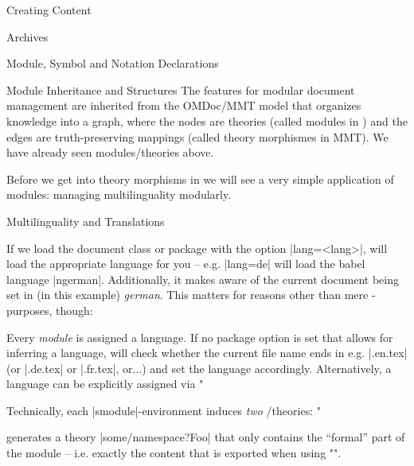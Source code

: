 \begin{sfragment}{Creating \sTeX Content}
  \begin{sfragment}[id=sec.stexarchives]{\sTeX Archives}
    
  \end{sfragment}

  \begin{sfragment}[id=sec.decls]{Module, Symbol and Notation Declarations}
    
    
  \end{sfragment}

  \begin{sfragment}{Module Inheritance and Structures}
    The \sTeX features for modular document management are inherited from the OMDoc/MMT
    model that organizes knowledge into a graph, where the nodes are theories (called
    modules in \sTeX) and the edges are truth-preserving mappings (called theory
    morphismes in MMT). We have already seen modules/theories above.

    Before we get into theory morphisms in \sTeX we will see a very simple application of
    modules: managing multilinguality modularly.

    \begin{sfragment}{Multilinguality and Translations}

      If we load the \sTeX document class or package with the option |lang=<lang>|, \sTeX
      will load the appropriate  language for you -- e.g. |lang=de| will load
      the babel language |ngerman|. Additionally, it makes \sTeX aware of the current
      document being set in (in this example) \emph{german}. This matters for reasons
      other than mere -purposes, though:

      Every \emph{module} is assigned a language. If no \sTeX
      package option is set that allows for inferring a language,
      \sTeX will check whether the current file name ends in
      e.g. |.en.tex| (or |.de.tex| or |.fr.tex|, or...) and
      set the language accordingly. Alternatively, a language
      can be explicitly assigned via 
      \stexcode"\fi

      \begin{mmtbox}
        Technically, each |smodule|-environment induces \emph{two}
        \omdoc/\mmt theories:
        \stexcode"\fi
        generates a theory |some/namespace?Foo| that only contains
        the ``formal'' part of the module -- i.e. exactly the
        content that is exported when using \stexcode"\importmodule".


\end{mmtbox}
\end{sfragment}
\end{sfragment}
\end{sfragment}
